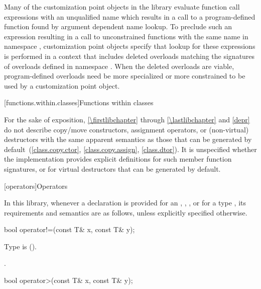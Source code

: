 \pnum
\begin{note}
Many of the customization point objects in the library evaluate function call
expressions with an unqualified name which results in a call to a
program-defined function found by argument dependent name
lookup. To preclude such an expression resulting in a
call to unconstrained functions with the same name in namespace ,
customization point objects specify that lookup for these expressions is
performed in a context that includes deleted overloads matching the signatures
of overloads defined in namespace . When the deleted overloads are
viable, program-defined overloads need be more specialized
or more constrained to be used by a customization point
object.
\end{note}

[functions.within.classes]{Functions within classes}

\pnum
For the sake of exposition, \ref{\firstlibchapter} through \ref{\lastlibchapter}
and \ref{depr} do not describe copy/move constructors, assignment
operators, or (non-virtual) destructors with the same apparent
semantics as those that can be generated
by default~(\ref{class.copy.ctor}, \ref{class.copy.assign}, \ref{class.dtor}).
%
%
%
It is unspecified whether
the implementation provides explicit definitions for such member function
signatures, or for virtual destructors that can be generated by default.

[operators]{Operators}

\pnum
In this library, whenever a declaration is provided for an ,
, , or 
for a type ,
its requirements and semantics are as follows,
unless explicitly specified otherwise.

%
\begin{itemdecl}
bool operator!=(const T& x, const T& y);
\end{itemdecl}

\begin{itemdescr}
\pnum
\requires
Type  is  ().

\pnum
\returns
{}.
\end{itemdescr}

%
\begin{itemdecl}
bool operator>(const T& x, const T& y);
\end{itemdecl}


